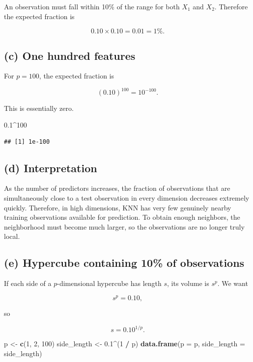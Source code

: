 \documentclass[
]{article}
\newenvironment{Shaded}{\begin{snugshade}}{\end{snugshade}}
\newcommand{\AttributeTok}[1]{\textcolor[rgb]{0.13,0.29,0.53}{#1}}
\newcommand{\DecValTok}[1]{\textcolor[rgb]{0.00,0.00,0.81}{#1}}
\newcommand{\FloatTok}[1]{\textcolor[rgb]{0.00,0.00,0.81}{#1}}
\newcommand{\FunctionTok}[1]{\textcolor[rgb]{0.13,0.29,0.53}{\textbf{#1}}}
\newcommand{\NormalTok}[1]{#1}
\newcommand{\OtherTok}[1]{\textcolor[rgb]{0.56,0.35,0.01}{#1}}
\newcommand{\SpecialCharTok}[1]{\textcolor[rgb]{0.81,0.36,0.00}{\textbf{#1}}}
\begin{document}
An observation must fall within 10\% of the range for both \(X_1\) and
\(X_2\). Therefore the expected fraction is

\[
0.10 \times 0.10 = 0.01 = 1\%.
\]

\subsection{(c) One hundred features}\label{c-one-hundred-features}

For \(p=100\), the expected fraction is

\[
(0.10)^{100}=10^{-100}.
\]

This is essentially zero.

\begin{Shaded}
\begin{Highlighting}[]
\FloatTok{0.1}\SpecialCharTok{\^{}}\DecValTok{100}
\end{Highlighting}
\end{Shaded}

\begin{verbatim}
## [1] 1e-100
\end{verbatim}

\subsection{(d) Interpretation}\label{d-interpretation}

As the number of predictors increases, the fraction of observations that
are simultaneously close to a test observation in every dimension
decreases extremely quickly. Therefore, in high dimensions, KNN has very
few genuinely nearby training observations available for prediction. To
obtain enough neighbors, the neighborhood must become much larger, so
the observations are no longer truly local.

\subsection{(e) Hypercube containing 10\% of
observations}\label{e-hypercube-containing-10-of-observations}

If each side of a \(p\)-dimensional hypercube has length \(s\), its
volume is \(s^p\). We want

\[
s^p=0.10,
\]

so

\[
s=0.10^{1/p}.
\]

\begin{Shaded}
\begin{Highlighting}[]
\NormalTok{p }\OtherTok{\textless{}{-}} \FunctionTok{c}\NormalTok{(}\DecValTok{1}\NormalTok{, }\DecValTok{2}\NormalTok{, }\DecValTok{100}\NormalTok{)}
\NormalTok{side\_length }\OtherTok{\textless{}{-}} \FloatTok{0.1}\SpecialCharTok{\^{}}\NormalTok{(}\DecValTok{1} \SpecialCharTok{/}\NormalTok{ p)}
\FunctionTok{data.frame}\NormalTok{(}\AttributeTok{p =}\NormalTok{ p, }\AttributeTok{side\_length =}\NormalTok{ side\_length)}
\end{Highlighting}
\end{Shaded}
\end{document}
